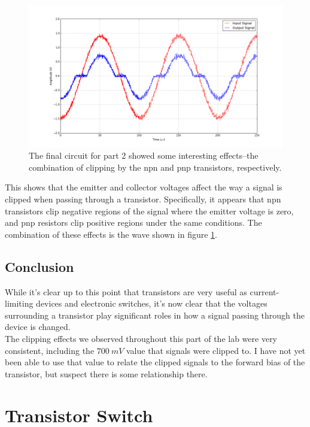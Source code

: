 \documentclass[11pt]{article}
\begin{document}
\begin{figure}[H]
    \centering
    \includegraphics[scale=0.4]{Plots/fig2b.png}
    \caption{The final circuit for part 2 showed some interesting effects--the combination of clipping by the npn and pnp transistors, respectively.}
    \label{fig:2b}
\end{figure}

This shows that the emitter and collector voltages affect the way a signal is clipped when passing through a transistor. Specifically, it appears that npn transistors clip negative regions of the signal where the emitter voltage is zero, and pnp resistors clip positive regions under the same conditions. The combination of these effects is the wave shown in figure \ref{fig:2b}.\\

\subsection{Conclusion}

While it's clear up to this point that transistors are very useful as current-limiting devices and electronic switches, it's now clear that the voltages surrounding a transistor play significant roles in how a signal passing through the device is changed.\\

The clipping effects we observed throughout this part of the lab were very consistent, including the $700\ mV$ value that signals were clipped to. I have not yet been able to use that value to relate the clipped signals to the forward bias of the transistor, but suspect there is some relationship there.\\


\section{Transistor Switch}
\end{document}
